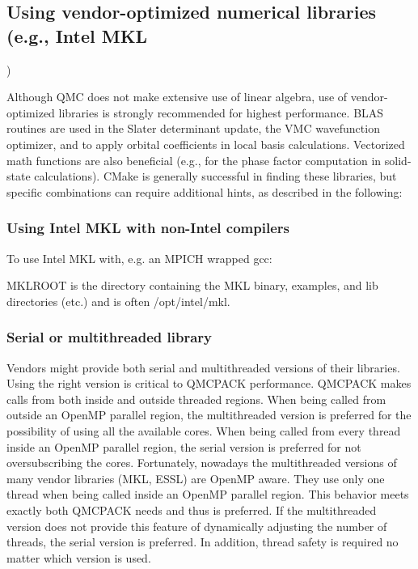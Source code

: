 \subsection{Using vendor-optimized numerical libraries (e.g., Intel MKL})

Although QMC does not make extensive use of linear algebra, use of
vendor-optimized libraries is strongly recommended for highest
performance. BLAS routines are used in the Slater determinant update, the VMC wavefunction optimizer,
and to apply orbital coefficients in local basis calculations. Vectorized
math functions are also beneficial (e.g., for the phase factor
computation in solid-state calculations). CMake is generally successful
in finding these libraries, but specific combinations can require
additional hints, as described in the following:

\subsubsection{Using Intel MKL with non-Intel compilers}

To use Intel MKL with, e.g. an MPICH wrapped gcc:


MKLROOT is the directory containing the MKL binary, examples, and lib
directories (etc.) and is often /opt/intel/mkl.

\subsubsection{Serial or multithreaded library}
\label{sec:threadedlibrary}
Vendors might provide both serial and multithreaded versions of their libraries.
Using the right version is critical to QMCPACK performance.
QMCPACK makes calls from both inside and outside threaded regions.
When being called from outside an OpenMP parallel region, the multithreaded version is preferred for the possibility of using all the available cores.
When being called from every thread inside an OpenMP parallel region, the serial version is preferred for not oversubscribing the cores.
Fortunately, nowadays the multithreaded versions of many vendor libraries (MKL, ESSL) are OpenMP aware.
They use only one thread when being called inside an OpenMP parallel region.
This behavior meets exactly both QMCPACK needs and thus is preferred.
If the multithreaded version does not provide this feature of dynamically adjusting the number of threads,
the serial version is preferred. In addition, thread safety is required no matter which version is used.

